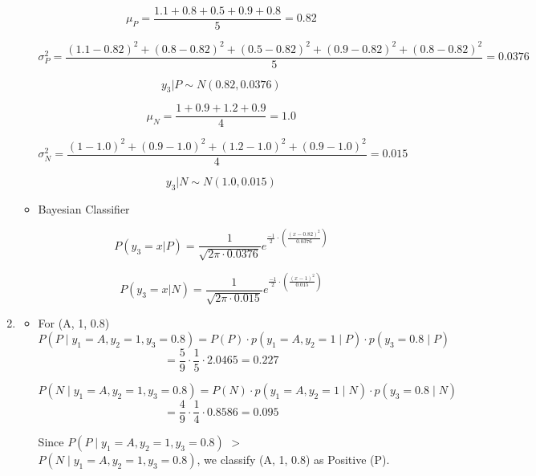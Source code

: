 \documentclass[12pt]{article}
\begin{document}
\begin{enumerate}[leftmargin=\labelsep, label=\textbf{\arabic*.)}]
\begin{itemize}
                    \[
                        \mu_P = \frac{1.1+0.8+0.5+0.9+0.8}{5} = 0.82
                    \]

                    \[
                        \sigma_P^2 = \frac{(1.1-0.82)^2 + (0.8-0.82)^2 + (0.5-0.82)^2 + (0.9-0.82)^2 + (0.8-0.82)^2}{5} = 0.0376
                    \]

                    \[
                        y_3 | P \sim N(0.82, 0.0376)
                    \]

                    \[
                        \mu_N = \frac{1+0.9+1.2+0.9}{4} = 1.0
                    \]

                    \[
                        \sigma_N^2 = \frac{(1-1.0)^2 + (0.9-1.0)^2 + (1.2-1.0)^2 + (0.9-1.0)^2}{4} = 0.015
                    \]

                    \[
                        y_3 | N \sim N(1.0, 0.015)
                    \]

              \item Bayesian Classifier

                    \[
                        P(y_3 = x | P) = \frac{1}{\sqrt{2\pi \cdot 0.0376}} e^{\frac{-1}{2} \cdot (\frac{(x - 0.82)^2}{0.0376})}
                    \]

                    \[
                        P(y_3 = x | N) = \frac{1}{\sqrt{2\pi \cdot 0.015}} e^{\frac{-1}{2} \cdot (\frac{(x - 1)^2}{0.015})}
                    \]

          \end{itemize}

    \item \begin{itemize}
              \item For (A, 1, 0.8)
                    \[
                        P(P \mid y_1 = A, y_2 = 1, y_3 = 0.8) = P(P) \cdot p(y_1 = A, y_2 = 1 \mid P) \cdot p(y_3 = 0.8 \mid P)
                    \]
                    \[
                        = \frac{5}{9} \cdot \frac{1}{5} \cdot 2.0465 = 0.227
                    \]

                    \[
                        P(N \mid y_1 = A, y_2 = 1, y_3 = 0.8) = P(N) \cdot p(y_1 = A, y_2 = 1 \mid N) \cdot p(y_3 = 0.8 \mid N)
                    \]
                    \[
                        = \frac{4}{9} \cdot \frac{1}{4} \cdot 0.8586 = 0.095
                    \]

                    Since \( P(P \mid y_1 = A, y_2 = 1, y_3 = 0.8) \) \(>\) \( P(N \mid y_1 = A, y_2 = 1, y_3 = 0.8) \), we classify (A, 1, 0.8) as Positive (P).


\end{itemize}
\end{enumerate}
\end{document}
